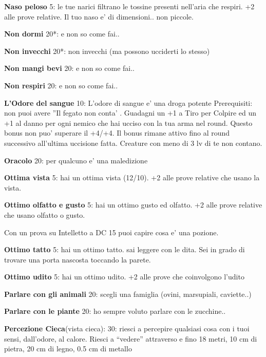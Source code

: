 \documentclass[a4paper,11pt,twoside,openany]{book}
\begin{document}
\textbf{Naso peloso} 5: le tue narici filtrano le tossine presenti nell'aria che respiri. +2 alle prove relative. Il tuo naso e' di dimensioni.. non piccole.

\textbf{Non dormi} 20{*}: e non so come fai..

\textbf{Non invecchi} 20{*}: non invecchi (ma possono ucciderti lo stesso)

\textbf{Non mangi bevi} 20: e non so come fai..

\textbf{Non respiri} 20: e non so come fai..

\textbf{L'Odore del sangue} 10: L'odore di sangue e' una droga potente
Prerequisiti: non puoi avere ''Il fegato non conta' . Guadagni un +1 a Tiro per Colpire ed un +1 al danno per ogni nemico che hai ucciso con la tua arma nel round. Questo bonus non puo' superare il +4/+4. Il bonus rimane attivo fino al round successivo all'ultima uccisione fatta. Creature con meno di 3 lv di te non contano.

\textbf{Oracolo} 20: per qualcuno e' una maledizione

\textbf{Ottima vista} 5: hai un ottima vista (12/10). +2 alle prove relative che usano la vista.

\textbf{Ottimo olfatto e gusto} 5: hai un ottimo gusto ed olfatto. +2 alle prove relative che usano olfatto o gusto.

Con un prova su Intelletto a DC 15 puoi capire cosa e' una pozione.

\textbf{Ottimo tatto} 5: hai un ottimo tatto. sai leggere con le dita. Sei in grado di trovare una porta nascosta toccando la parete.

\textbf{Ottimo udito} 5: hai un ottimo udito. +2 alle prove che coinvolgono l'udito

\textbf{Parlare con gli animali} 20: scegli una famiglia (ovini, marsupiali, caviette..)

\textbf{Parlare con le piante} 20: ho sempre voluto parlare con le zucchine..

\textbf{Percezione Cieca}(vista cieca): 30: riesci a percepire qualsiasi cosa con i tuoi sensi, dall’odore, al calore. Riesci a “vedere” attraverso e fino 18 metri, 10 cm di pietra, 20 cm di legno, 0.5 cm di metallo
\end{document}
